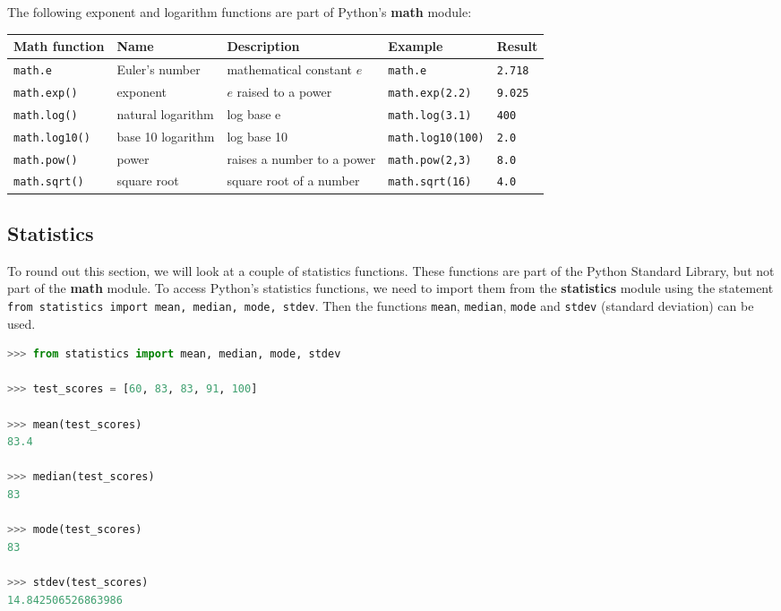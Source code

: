 \documentclass{book}
\newcommand{\passthrough}[1]{#1}
\begin{document}
The following exponent and logarithm functions are part of Python's
\textbf{math} module:

\begin{longtable}[]{@{}lllll@{}}
\toprule
Math function & Name & Description & Example & Result\tabularnewline
\midrule
\endhead
\passthrough{\lstinline!math.e!} & Euler's number & mathematical
constant \(e\) & \passthrough{\lstinline!math.e!} &
\passthrough{\lstinline!2.718!}\tabularnewline
\passthrough{\lstinline!math.exp()!} & exponent & \(e\) raised to a
power & \passthrough{\lstinline!math.exp(2.2)!} &
\passthrough{\lstinline!9.025!}\tabularnewline
\passthrough{\lstinline!math.log()!} & natural logarithm & log base e &
\passthrough{\lstinline!math.log(3.1)!} &
\passthrough{\lstinline!400!}\tabularnewline
\passthrough{\lstinline!math.log10()!} & base 10 logarithm & log base 10
& \passthrough{\lstinline!math.log10(100)!} &
\passthrough{\lstinline!2.0!}\tabularnewline
\passthrough{\lstinline!math.pow()!} & power & raises a number to a
power & \passthrough{\lstinline!math.pow(2,3)!} &
\passthrough{\lstinline!8.0!}\tabularnewline
\passthrough{\lstinline!math.sqrt()!} & square root & square root of a
number & \passthrough{\lstinline!math.sqrt(16)!} &
\passthrough{\lstinline!4.0!}\tabularnewline
\bottomrule
\end{longtable}
    




    
        \hypertarget{statistics}{%
\subsection{Statistics}\label{statistics}}
    




    
        To round out this section, we will look at a couple of statistics
functions. These functions are part of the Python Standard Library, but
not part of the \textbf{math} module. To access Python's statistics
functions, we need to import them from the \textbf{statistics} module
using the statement
\passthrough{\lstinline!from statistics import mean, median, mode, stdev!}.
Then the functions \passthrough{\lstinline!mean!},
\passthrough{\lstinline!median!}, \passthrough{\lstinline!mode!} and
\passthrough{\lstinline!stdev!} (standard deviation) can be used.

\begin{lstlisting}[language=Python]
>>> from statistics import mean, median, mode, stdev
    
>>> test_scores = [60, 83, 83, 91, 100]
    
>>> mean(test_scores)
83.4

>>> median(test_scores)
83

>>> mode(test_scores)
83
    
>>> stdev(test_scores)
14.842506526863986 
\end{lstlisting}
\end{document}
